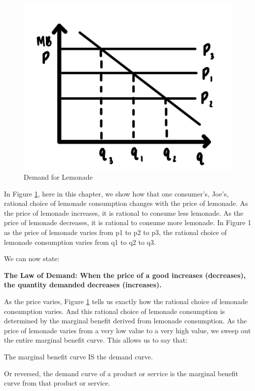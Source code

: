 \documentclass[
]{book}
\begin{document}
\begin{figure}

{\centering \includegraphics[width=0.75\linewidth]{img/demand/fig2} 

}

\caption{Demand for Lemonade}\label{fig:demand02}
\end{figure}

In Figure \ref{fig:demand02}, here in this chapter, we show how that one consumer's, Joe's, rational choice of lemonade consumption changes with the price of lemonade. As the price of lemonade increases, it is rational to consume less lemonade. As the price of lemonade decreases, it is rational to consume more lemonade. In Figure 1 as the price of lemonade varies from p1 to p2 to p3, the rational choice of lemonade consumption varies from q1 to q2 to q3.

We can now state:

\begin{iucolor}
\textbf{The Law of Demand: When the price of a good increases (decreases), the quantity demanded decreases (increases).}

\end{iucolor}

As the price varies, Figure \ref{fig:demand02} tells us exactly how the rational choice of lemonade consumption varies. And this rational choice of lemonade consumption is determined by the marginal benefit derived from lemonade consumption. As the price of lemonade varies from a very low value to a very high value, we sweep out the entire marginal benefit curve. This allows us to say that:

The marginal benefit curve IS the demand curve.

Or reversed, the demand curve of a product or service is the marginal benefit curve from that product or service.
\end{document}
